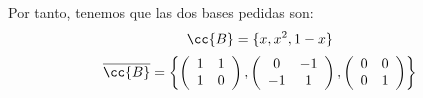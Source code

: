 \documentclass[12pt]{article}
\begin{document}
\begin{ejercicio}
    Por tanto, tenemos que las dos bases pedidas son:
    \begin{equation*}
        \cc{B}=\{x,x^2, 1-x\}
    \end{equation*}
    \begin{equation*}
        \overline{\cc{B}}=\left\{
            \left(\begin{array}{cc}
                1 & 1 \\
                1 & 0
            \end{array}\right),
            \left(\begin{array}{cc}
                0 & -1 \\
                -1 & 1
            \end{array}\right),
            \left(\begin{array}{cc}
                0 & 0 \\
                0 & 1
            \end{array}\right)
        \right\}
    \end{equation*}
\end{ejercicio}
\end{document}
